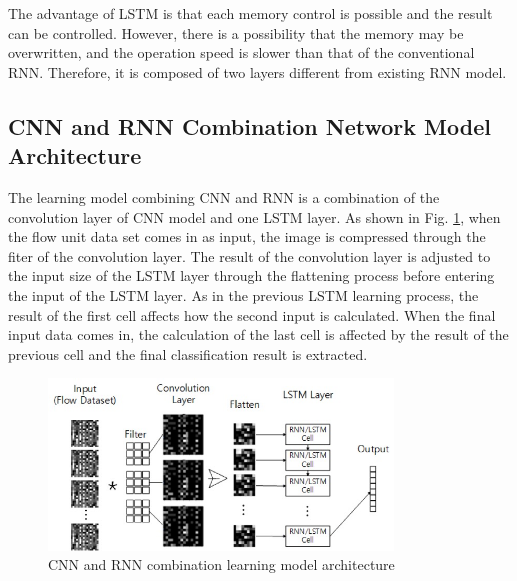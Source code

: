 The advantage of LSTM is that each memory control is possible and the result can be controlled.
However, there is a possibility that the memory may be overwritten, and the operation speed is slower than that of the conventional RNN.
Therefore, it is composed of two layers different from existing RNN model.

\subsection{CNN and RNN Combination Network Model Architecture}
The learning model combining CNN and RNN is a combination of the convolution layer of CNN model and one LSTM layer.
As shown in Fig. \ref{fig6}, when the flow unit data set comes in as input, the image is compressed through the fiter of the convolution layer.
The result of the convolution layer is adjusted to the input size of the LSTM layer through the flattening process before entering the input of the LSTM layer.
As in the previous LSTM learning process, the result of the first cell affects how the second input is calculated.
When the final input data comes in, the calculation of the last cell is affected by the result of the previous cell and the final classification result is extracted.

\begin{figure}[b]
\centering
\setlength{\abovecaptionskip}{0pt}
\setlength{\belowcaptionskip}{0pt}
{
\includegraphics[width=3.6in]{fig6.jpg}
\caption{CNN and RNN combination learning model architecture}
\label{fig6}
}
\end{figure}